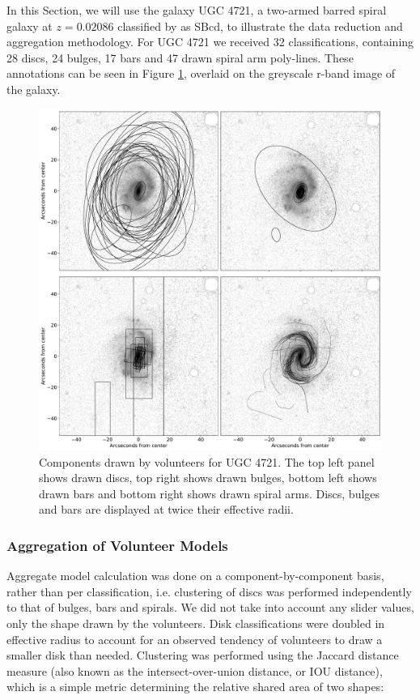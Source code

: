\documentclass[../main.tex]{subfiles}
\begin{document}
In this Section, we will use the galaxy UGC 4721, a two-armed barred spiral galaxy at $z=0.02086$ classified by \citet{deVaucouleurs1991} as SBcd, to illustrate the data reduction and aggregation methodology. For UGC 4721 we received 32 classifications, containing 28 discs, 24 bulges, 17 bars and 47 drawn spiral arm poly-lines. These annotations can be seen in Figure \ref{fig:drawn_shapes}, overlaid on the greyscale r-band image of the galaxy.

\begin{figure}
  \includegraphics[width=17.3cm]{images__method/drawn_shapes.pdf}
  \caption{Components drawn by volunteers for UGC 4721. The top left panel shows drawn discs, top right shows drawn bulges, bottom left shows drawn bars and bottom right shows drawn spiral arms. Discs, bulges and bars are displayed at twice their effective radii.}
  \label{fig:drawn_shapes}
\end{figure}

\subsubsection{Aggregation of Volunteer Models}
\label{sec:aggregation_of_volunteer_models}

Aggregate model calculation was done on a component-by-component basis, rather than per classification, i.e. clustering of discs was performed independently to that of bulges, bars and spirals. We did not take into account any slider values, only the shape drawn by the volunteers. Disk classifications were doubled in effective radius to account for an observed tendency of volunteers to draw a smaller disk than needed. Clustering was performed using the Jaccard distance measure (also known as the intersect-over-union distance, or IOU distance), which is a simple metric determining the relative shared area of two shapes:
\end{document}
